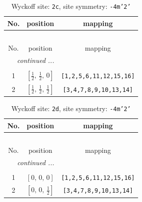 \documentclass[fleqn,8pt]{jsarticle}
\begin{document}
\renewcommand{\arraystretch}{1.2}
\begin{longtable}{ccc}
\caption{Wyckoff site: {\tt 2c}, site symmetry: {\tt -4m'2'}}
 \\
 \hline \hline
No. & position & mapping \\ \hline \endfirsthead

\multicolumn{2}{l}{\tablename\ \thetable{}} \\
 \hline \hline
No. & position & mapping \\ \hline \endhead

 \hline \hline
\multicolumn{2}{r}{\footnotesize\it continued ...} \\ \endfoot

 \hline \hline
\multicolumn{2}{r}{} \\ \endlastfoot

1 & $\left[ \frac{1}{2},\, \frac{1}{2},\, 0 \right]$ & {\tt [1,2,5,6,11,12,15,16]} \\ \hline
2 & $\left[ \frac{1}{2},\, \frac{1}{2},\, \frac{1}{2} \right]$ & {\tt [3,4,7,8,9,10,13,14]} \\
\end{longtable}
\renewcommand{\arraystretch}{1.2}
\begin{longtable}{ccc}
\caption{Wyckoff site: {\tt 2d}, site symmetry: {\tt -4m'2'}}
 \\
 \hline \hline
No. & position & mapping \\ \hline \endfirsthead

\multicolumn{2}{l}{\tablename\ \thetable{}} \\
 \hline \hline
No. & position & mapping \\ \hline \endhead

 \hline \hline
\multicolumn{2}{r}{\footnotesize\it continued ...} \\ \endfoot

 \hline \hline
\multicolumn{2}{r}{} \\ \endlastfoot

1 & $\left[ 0,\, 0,\, 0 \right]$ & {\tt [1,2,5,6,11,12,15,16]} \\ \hline
2 & $\left[ 0,\, 0,\, \frac{1}{2} \right]$ & {\tt [3,4,7,8,9,10,13,14]} \\
\end{longtable}
\renewcommand{\arraystretch}{1.2}
\end{document}
